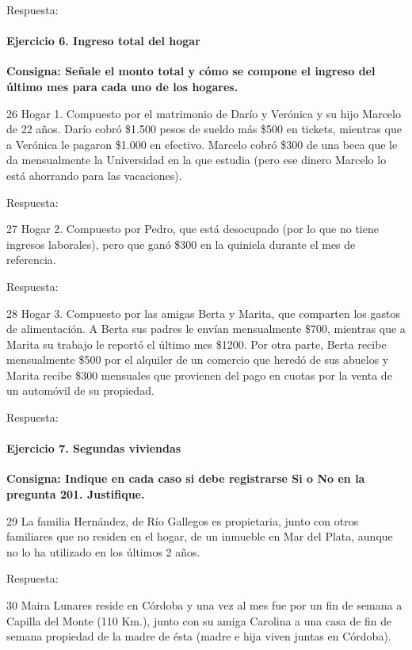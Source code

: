 \documentclass[
  openany]{book}
\begin{document}
Respuesta:

\hypertarget{ejercicio-6.-ingreso-total-del-hogar}{%
\paragraph{Ejercicio 6. Ingreso total del hogar}\label{ejercicio-6.-ingreso-total-del-hogar}}

\textbf{Consigna: Señale el monto total y cómo se compone el ingreso del último mes para cada uno de los hogares.}

26 Hogar 1. Compuesto por el matrimonio de Darío y Verónica y su hijo Marcelo de 22 años. Darío cobró \$1.500 pesos de sueldo más \$500 en tickets, mientras que a Verónica le pagaron \$1.000 en efectivo. Marcelo cobró \$300 de una beca que le da mensualmente la Universidad en la que estudia (pero ese dinero Marcelo lo está ahorrando para las vacaciones).

Respuesta:

27 Hogar 2. Compuesto por Pedro, que está desocupado (por lo que no tiene ingresos laborales), pero que ganó \$300 en la quiniela durante el mes de referencia.

Respuesta:

28 Hogar 3. Compuesto por las amigas Berta y Marita, que comparten los gastos de alimentación. A Berta sus padres le envían mensualmente \$700, mientras que a Marita su trabajo le reportó el último mes \$1200. Por otra parte, Berta recibe mensualmente \$500 por el alquiler de un comercio que heredó de sus abuelos y Marita recibe \$300 mensuales que provienen del pago en cuotas por la venta de un automóvil de su propiedad.

Respuesta:

\hypertarget{ejercicio-7.-segundas-viviendas}{%
\paragraph{Ejercicio 7. Segundas viviendas}\label{ejercicio-7.-segundas-viviendas}}

\textbf{Consigna: Indique en cada caso si debe registrarse Si o No en la pregunta 201. Justifique.}

29 La familia Hernández, de Río Gallegos es propietaria, junto con otros familiares que no residen en el hogar, de un inmueble en Mar del Plata, aunque no lo ha utilizado en los últimos 2 años.

Respuesta:

30 Maira Lunares reside en Córdoba y una vez al mes fue por un fin de semana a Capilla del Monte (110 Km.), junto con su amiga Carolina a una casa de fin de semana propiedad de la madre de ésta (madre e hija viven juntas en Córdoba).
\end{document}
